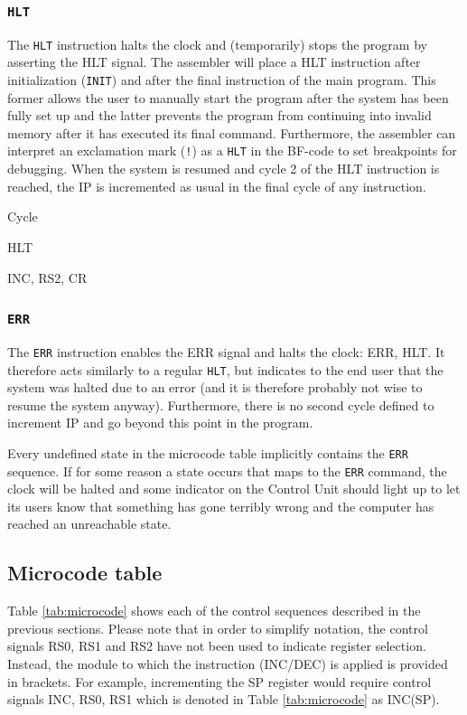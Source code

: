 \subsubsection{\texttt{HLT}}
The \texttt{HLT} instruction halts the clock and (temporarily) stops the program by asserting the HLT signal. The assembler will place a HLT instruction after initialization (\texttt{INIT}) and after the final instruction of the main program. This former allows the user to manually start the program after the system has been fully set up and the latter prevents the program from continuing into invalid memory after it has executed its final command. Furthermore, the assembler can interpret an exclamation mark (\texttt{!}) as a \texttt{HLT} in the BF-code to set breakpoints for debugging. When the system is resumed and cycle 2 of the HLT instruction is reached, the IP is incremented as usual in the final cycle of any instruction.

\begin{labeledenum}{Cycle}
\item HLT
\item INC, RS2, CR
\end{labeledenum}

\subsubsection{\texttt{ERR}}
The \texttt{ERR} instruction enables the ERR signal and halts the clock: ERR, HLT. It therefore acts similarly to a regular \texttt{HLT}, but indicates to the end user that the system was halted due to an error (and it is therefore probably not wise to resume the system anyway). Furthermore, there is no second cycle defined to increment IP and go beyond this point in the program.

Every undefined state in the microcode table implicitly contains the \texttt{ERR} sequence. If for some reason a state occurs that maps to the \texttt{ERR} command, the clock will be halted and some indicator on the Control Unit should light up to let its users know that something has gone terribly wrong and the computer has reached an unreachable state.

\subsection{Microcode table}
Table \ref{tab:microcode} shows each of the control sequences described in the previous sections. Please note that in order to simplify notation, the control signals RS0, RS1 and RS2 have not been used to indicate register selection. Instead, the module to which the instruction (INC/DEC) is applied is provided in brackets. For example, incrementing the SP register would require control signals INC, RS0, RS1 which is denoted in Table \ref{tab:microcode} as INC(SP).
\newpage





